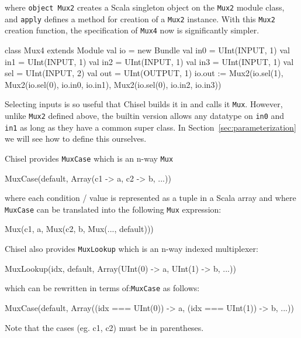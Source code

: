 \documentclass[twocolumn,10pt]{article}
\def\code#1{{\tt #1}}
\begin{document}
\noindent
where \code{object Mux2} creates a Scala singleton object on the \code{Mux2}
module class, and \code{apply} defines a method for creation of a \code{Mux2} instance.
%
With this \code{Mux2} creation function, the specification of \code{Mux4} now is
significantly simpler.

\begin{scala}
class Mux4 extends Module {
  val io = new Bundle {
    val in0 = UInt(INPUT, 1)
    val in1 = UInt(INPUT, 1)
    val in2 = UInt(INPUT, 1)
    val in3 = UInt(INPUT, 1)
    val sel = UInt(INPUT, 2)
    val out = UInt(OUTPUT, 1)
  }
  io.out := Mux2(io.sel(1),
                 Mux2(io.sel(0), io.in0, io.in1),
                 Mux2(io.sel(0), io.in2, io.in3))
}
\end{scala}

Selecting inputs is so useful that Chisel builds it in and calls it
\code{Mux}.  However, unlike \code{Mux2} defined above, the builtin version allows any datatype on
\code{in0} and \code{in1} as long as they have a common super class.
In Section~\ref{sec:parameterization} we will see how to define this
ourselves.

Chisel provides \code{MuxCase} which is an n-way \code{Mux} 
\begin{scala}
MuxCase(default, Array(c1 -> a, c2 -> b, ...))
\end{scala}
 
\noindent
where each condition / value is represented as a tuple in a Scala
array and where \code{MuxCase} can be translated into the following
\code{Mux} expression:

\begin{scala}
Mux(c1, a, Mux(c2, b, Mux(..., default)))
\end{scala}

\noindent
Chisel also provides \code{MuxLookup} which is an n-way indexed multiplexer:

\begin{scala}
MuxLookup(idx, default, 
          Array(UInt(0) -> a, UInt(1) -> b, ...))
\end{scala}

\noindent
which can be rewritten in terms of:\verb+MuxCase+ as follows:

\begin{scala}
MuxCase(default, 
        Array((idx === UInt(0)) -> a, 
              (idx === UInt(1)) -> b, ...))
\end{scala}

\noindent
Note that the cases (eg. c1, c2) must be in parentheses.
\end{document}
